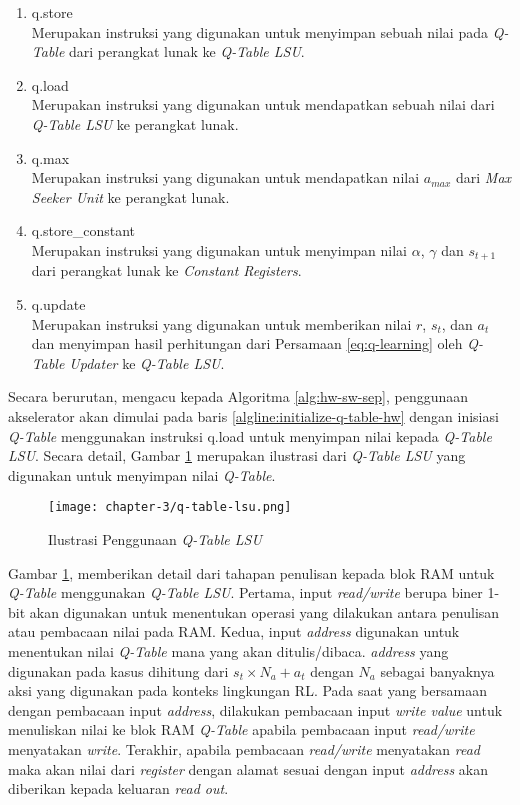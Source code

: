 \begin{enumerate}
	\item q.store\\
	      Merupakan instruksi yang digunakan untuk menyimpan sebuah nilai pada \textit{Q-Table} dari perangkat lunak ke \textit{Q-Table \ac{LSU}}.
	\item q.load\\
	      Merupakan instruksi yang digunakan untuk mendapatkan sebuah nilai dari \textit{Q-Table \ac{LSU}} ke perangkat lunak.
	\item q.max\\
	      Merupakan instruksi yang digunakan untuk mendapatkan nilai $a_{max}$ dari \textit{Max Seeker Unit} ke perangkat lunak.
	\item q.store\_constant\\
	      Merupakan instruksi yang digunakan untuk menyimpan nilai $\alpha$, $\gamma$ dan $s_{t+1}$ dari perangkat lunak ke \textit{Constant Registers}.
	\item q.update\\
	      Merupakan instruksi yang digunakan untuk memberikan nilai $r$, $s_t$, dan $a_t$ dan menyimpan hasil perhitungan dari Persamaan \ref{eq:q-learning} oleh \textit{Q-Table Updater} ke \textit{Q-Table \ac{LSU}}.
\end{enumerate}

Secara berurutan, mengacu kepada Algoritma \ref{alg:hw-sw-sep}, penggunaan akselerator akan dimulai pada baris \ref{algline:initialize-q-table-hw} dengan inisiasi \textit{Q-Table} menggunakan instruksi q.load untuk menyimpan nilai kepada \textit{Q-Table \ac{LSU}}. Secara detail, Gambar \ref{fig:q-table-lsu} merupakan ilustrasi dari \textit{Q-Table \ac{LSU}} yang digunakan untuk menyimpan nilai \textit{Q-Table}.

\begin{figure}[H]
	\centering
	\texttt{[image: chapter-3/q-table-lsu.png]}
	\caption{Ilustrasi Penggunaan \textit{Q-Table \ac{LSU}}}
	\label{fig:q-table-lsu}
\end{figure}

Gambar \ref{fig:q-table-lsu}, memberikan detail dari tahapan penulisan kepada blok \ac{RAM} untuk \textit{Q-Table} menggunakan \textit{Q-Table \ac{LSU}}. Pertama, input \textit{read/write} berupa biner 1-bit akan digunakan untuk menentukan operasi yang dilakukan antara penulisan atau pembacaan nilai pada \ac{RAM}. Kedua, input \textit{address} digunakan untuk menentukan nilai \textit{Q-Table} mana yang akan ditulis/dibaca. \textit{address} yang digunakan pada kasus dihitung dari $s_t \times N_a + a_t$ dengan $N_a$ sebagai banyaknya aksi yang digunakan pada konteks lingkungan \ac{RL}. Pada saat yang bersamaan dengan pembacaan input \textit{address}, dilakukan pembacaan input \textit{write value} untuk menuliskan nilai ke blok \ac{RAM} \textit{Q-Table} apabila pembacaan input \textit{read/write} menyatakan \textit{write}. Terakhir, apabila pembacaan \textit{read/write} menyatakan \textit{read} maka akan nilai dari \textit{register} dengan alamat sesuai dengan input \textit{address} akan diberikan kepada keluaran \textit{read out}.

